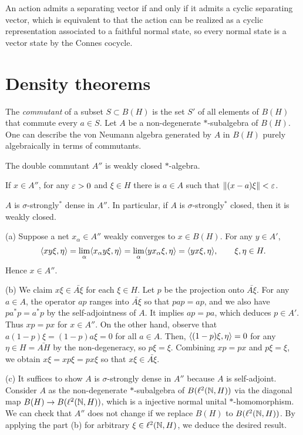 \documentclass{../../large}
\begin{document}
An action admits a separating vector if and only if it admits a cyclic separating vector, which is equivalent to that the action can be realized as a cyclic representation associated to a faithful normal state, so every normal state is a vector state by the Connes cocycle.

\section{Density theorems}



\begin{prb}
The \emph{commutant} of a subset $S\subset B(H)$ is the set $S'$ of all elements of $B(H)$ that commute every $a\in S$.
Let $A$ be a non-degenerate $*$-subalgebra of $B(H)$.
One can describe the von Neumann algebra generated by $A$ in $B(H)$ purely algebraically in terms of commutants.
\begin{parts}
\item The double commutant $A''$ is weakly closed $*$-algebra.
\item If $x\in A''$, for any $\varepsilon>0$ and $\xi\in H$ there is $a\in A$ such that $\|(x-a)\xi\|<\varepsilon$.
\item $A$ is $\sigma$-strongly$^*$ dense in $A''$. In particular, if $A$ is $\sigma$-strongly$^*$ closed, then it is weakly closed.
\end{parts}
\end{prb}
\begin{pf}
(a)
Suppose a net $x_\alpha\in A''$ weakly converges to $x\in B(H)$.
For any $y\in A'$,
\[\langle xy\xi,\eta\rangle=\lim_\alpha\langle x_\alpha y\xi,\eta\rangle=\lim_\alpha\langle yx_\alpha\xi,\eta\rangle=\langle yx\xi,\eta\rangle,\qquad \xi,\eta\in H.\]
Hence $x\in A''$.

(b)
We claim $x\xi\in\bar{A\xi}$ for each $\xi\in H$.
Let $p$ be the projection onto $\bar{A\xi}$.
For any $a\in A$, the operator $ap$ ranges into $\bar{A\xi}$ so that $pap=ap$, and we also have $pa^*p=a^*p$ by the self-adjointness of $A$.
It implies $ap=pa$, which deduces $p\in A'$.
Thus $xp=px$ for $x\in A''$.
On the other hand, observe that $a(1-p)\xi=(1-p)a\xi=0$ for all $a\in A$.
Then, $\langle(1-p)\xi,\eta\rangle=0$ for any $\eta\in H=\bar{AH}$ by the non-degeneracy, so $p\xi=\xi$.
Combining $xp=px$ and $p\xi=\xi$, we obtain $x\xi=xp\xi=px\xi$ so that $x\xi\in\bar{A\xi}$.

(c)
It suffices to show $A$ is $\sigma$-strongly dense in $A''$ because $A$ is self-adjoint.
Consider $A$ as the non-degenerate $*$-subalgebra of $B(\ell^2(\mathbb{N},H))$ via the diagonal map $B(H)\to B(\ell^2(\mathbb{N},H))$, which is a injective normal unital $*$-homomorphism.
We can check that $A''$ does not change if we replace $B(H)$ to $B(\ell^2(\mathbb{N},H))$.
By applying the part (b) for arbitrary $\xi\in\ell^2(\mathbb{N},H)$, we deduce the desired result.
\end{pf}
\end{document}
